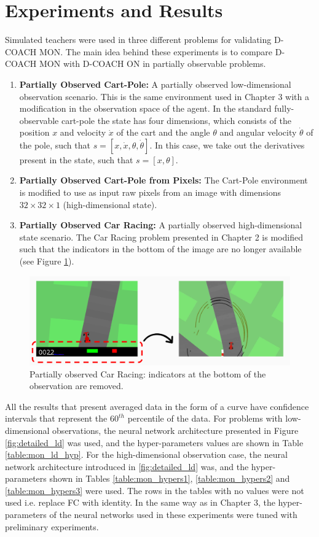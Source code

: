 \section{Experiments and Results}
Simulated teachers were used in three different problems for validating D-COACH MON. The main idea behind these experiments is to compare D-COACH MON with D-COACH ON in partially observable problems.

\begin{enumerate}
    \item \textbf{Partially Observed Cart-Pole:} A partially observed low-dimensional observation scenario. This is the same environment used in Chapter 3 with a modification in the observation space of the agent. In the standard fully-observable cart-pole the state has four dimensions, which consists of the position $x$ and velocity $\dot x$ of the cart and the angle $\theta$ and angular velocity $\dot \theta$ of the pole, such that $s=[x, \dot x, \theta, \dot \theta]$. In this case, we take out the derivatives present in the state, such that $s=[x, \theta]$.
    \item \textbf{Partially Observed Cart-Pole from Pixels:} The Cart-Pole environment is modified to use as input raw pixels from an image with dimensions $32\times32\times1$ (high-dimensional state). 
    \item \textbf{Partially Observed Car Racing:} A partially observed high-dimensional state scenario. The Car Racing problem presented in Chapter 2 is modified such that the indicators in the bottom of the image are no longer available (see Figure \ref{fig:no_inds_car_racing}). 
\end{enumerate}

\begin{figure}[h]
    \centering
    \includegraphics[width=0.7\linewidth]{imagenes/cap4/car_racing_no_inds.PNG}
    \caption[Partially observed Car Racing.]{Partially observed Car Racing: indicators at the bottom of the observation are removed.}
    \label{fig:no_inds_car_racing}
\end{figure}

All the results that present averaged data in the form of a curve have confidence intervals that represent the $60^{th}$ percentile of the data. For problems with low-dimensional observations, the neural network architecture presented in Figure \ref{fig:detailed_ld} was used, and the hyper-parameters values are shown in Table \ref{table:mon_ld_hyp}. For the high-dimensional observation case, the neural network architecture introduced in \ref{fig:detailed_ld} was, and the hyper-parameters shown in Tables \ref{table:mon_hypers1}, \ref{table:mon_hypers2} and \ref{table:mon_hypers3} were used. The rows in the tables with no values were not used i.e. replace FC with identity. In the same way as in Chapter 3, the hyper-parameters of the neural networks used in these experiments were tuned with preliminary experiments.

